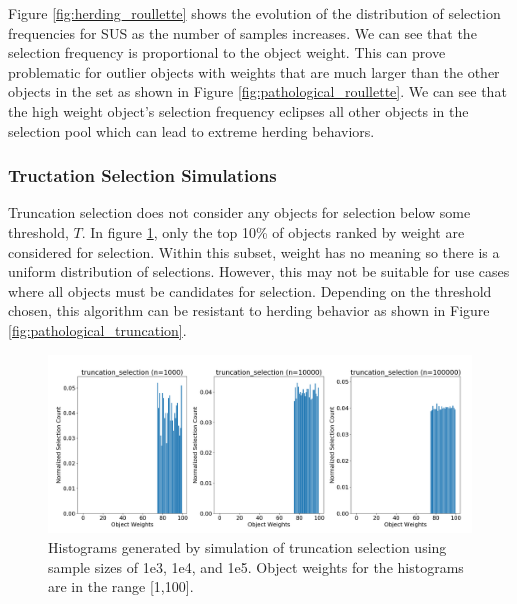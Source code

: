 \documentclass[12pt]{article}
\begin{document}
    Figure \ref{fig:herding_roullette} shows the evolution of the
    distribution of selection frequencies for SUS as the number of samples
    increases. We can see that the selection frequency is proportional to the
    object weight. This can prove problematic for outlier objects with weights
    that are much larger than the other objects in the set as shown in Figure
    \ref{fig:pathological_roullette}. We can see that the high weight object's
    selection frequency eclipses all other objects in the selection pool which
    can lead to extreme herding behaviors.

    \subsubsection{Tructation Selection Simulations}
    Truncation selection \cite{truncation1973} does not consider any objects
    for selection below some threshold, $T$. In figure
    \ref{fig:herding_truncation}, only the top 10\% of objects ranked by weight
    are considered for selection. Within this subset, weight has no meaning so
    there is a uniform distribution of selections. However, this may not be
    suitable for use cases where all objects must be candidates for selection.
    Depending on the threshold chosen, this algorithm can be resistant to
    herding behavior as shown in Figure \ref{fig:pathological_truncation}. 

    \begin{figure}[h]
      \centering
      \includegraphics[scale=0.32]{images/herding_truncation.png} 
      \caption{Histograms generated by simulation of truncation selection
               using sample sizes of 1e3, 1e4, and 1e5. Object weights
               for the histograms are in the range [1,100].}
      \label{fig:herding_truncation}
    \end{figure}
\end{document}
